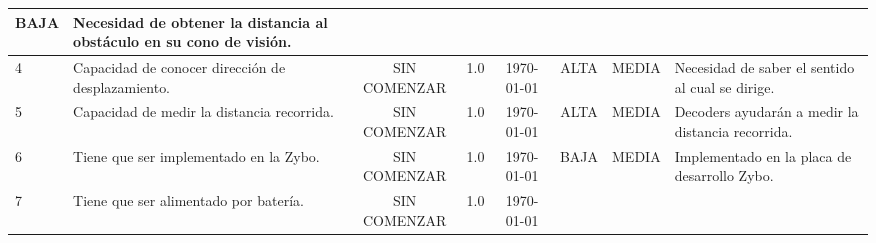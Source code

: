 \begin{landscape}
\begin{tabular}{| l | m{4.5cm} | c | c | c | c | c | m{5.5cm} |}
    BAJA &                                              %
    Necesidad de obtener la distancia al obstáculo en su cono de visión.\\\hline   
    4 &                                                 %
    Capacidad de conocer dirección de desplazamiento. & %
    \cellcolor{red} SIN COMENZAR & 1.0 & \today &       %
    ALTA &                                              %
    MEDIA &                                             %
    Necesidad de saber el sentido al cual se dirige.\\\hline
    5 &                                                 %
    Capacidad de medir la distancia recorrida.  &       %
    \cellcolor{red} SIN COMENZAR & 1.0 & \today &       %
    ALTA &                                              %
    MEDIA &                                             %
    Decoders ayudarán a medir la distancia recorrida.\\\hline
    6 &                                                 %
    Tiene que ser implementado en la Zybo.  &       %
    \cellcolor{red} SIN COMENZAR & 1.0 & \today &       %
    BAJA &                                              %
    MEDIA &                                             %
    Implementado en la placa de desarrollo Zybo.\\\hline
    7 &                                                 %
    Tiene que ser alimentado por batería.  &       %
    \cellcolor{red} SIN COMENZAR & 1.0 & \today &       %

\end{tabular}
\end{landscape}
